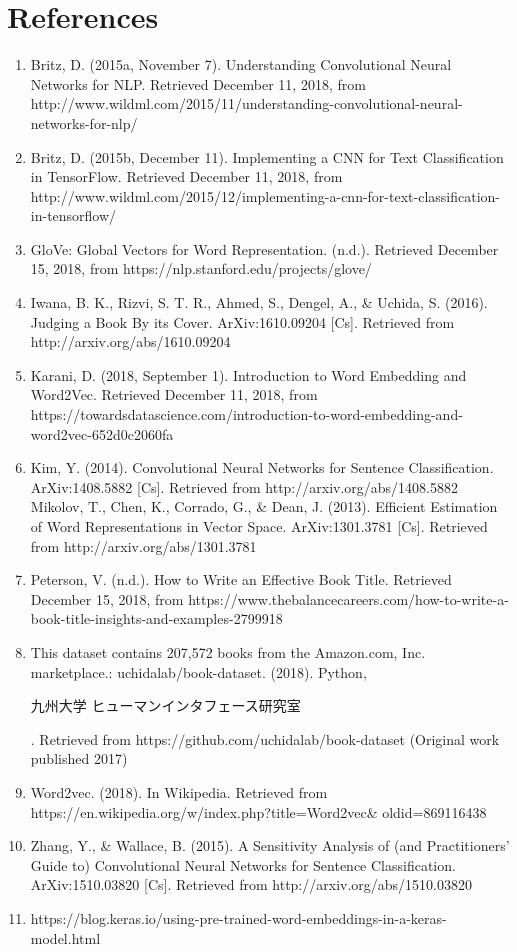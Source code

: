 \documentclass[jou,apacite, 10px]{apa6}
\begin{document}
\section{References}
\begin{enumerate}[(1)]
\item Britz, D. (2015a, November 7). Understanding Convolutional Neural Networks for NLP. Retrieved December 11, 2018, from http://www.wildml.com/2015/11/understanding-convolutional-neural-networks-for-nlp/
\item Britz, D. (2015b, December 11). Implementing a CNN for Text Classification in TensorFlow. Retrieved December 11, 2018, from http://www.wildml.com/2015/12/implementing-a-cnn-for-text-classification-in-tensorflow/
\item GloVe: Global Vectors for Word Representation. (n.d.). Retrieved December 15, 2018, from https://nlp.stanford.edu/projects/glove/
\item Iwana, B. K., Rizvi, S. T. R., Ahmed, S., Dengel, A., \& Uchida, S. (2016). Judging a Book By its Cover. ArXiv:1610.09204 [Cs]. Retrieved from http://arxiv.org/abs/1610.09204
\item Karani, D. (2018, September 1). Introduction to Word Embedding and Word2Vec. Retrieved December 11, 2018, from https://towardsdatascience.com/introduction-to-word-embedding-and-word2vec-652d0c2060fa
\item Kim, Y. (2014). Convolutional Neural Networks for Sentence Classification. ArXiv:1408.5882 [Cs]. Retrieved from http://arxiv.org/abs/1408.5882
Mikolov, T., Chen, K., Corrado, G., \& Dean, J. (2013). Efficient Estimation of Word Representations in Vector Space. ArXiv:1301.3781 [Cs]. Retrieved from http://arxiv.org/abs/1301.3781
\item Peterson, V. (n.d.). How to Write an Effective Book Title. Retrieved December 15, 2018, from https://www.thebalancecareers.com/how-to-write-a-book-title-insights-and-examples-2799918
\item This dataset contains 207,572 books from the Amazon.com, Inc. marketplace.: uchidalab/book-dataset. (2018). Python, \begin{CJK}{UTF8}{min}九州大学 ヒューマンインタフェース研究室\end{CJK}. Retrieved from https://github.com/uchidalab/book-dataset (Original work published 2017)
\item Word2vec. (2018). In Wikipedia. Retrieved from https://en.wikipedia.org/w/index.php?title=Word2vec\& oldid=869116438
\item Zhang, Y., \& Wallace, B. (2015). A Sensitivity Analysis of (and Practitioners’ Guide to) Convolutional Neural Networks for Sentence Classification. ArXiv:1510.03820 [Cs]. Retrieved from http://arxiv.org/abs/1510.03820
\item https://blog.keras.io/using-pre-trained-word-embeddings-in-a-keras-model.html
\end{enumerate}
\end{document}
